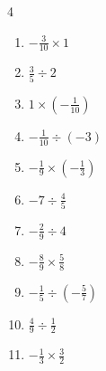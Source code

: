 \begin{multicols}{4}
\begin{enumerate}

  \item $\displaystyle -\frac{3}{10}\times{}1$


  \item $\displaystyle \frac{3}{5}\div{}2$


  \item $\displaystyle 1\times{}\left(-\frac{1}{10}\right)$


  \item $\displaystyle -\frac{1}{10}\div{}\left(-3\right)$


  \item $\displaystyle -\frac{1}{9}\times{}\left(-\frac{1}{3}\right)$


  \item $\displaystyle -7\div{}\frac{4}{5}$


  \item $\displaystyle -\frac{2}{9}\div{}4$


\columnbreak %

  \item $\displaystyle -\frac{8}{9}\times{}\frac{5}{8}$


  \item $\displaystyle -\frac{1}{5}\div{}\left(-\frac{5}{7}\right)$


  \item $\displaystyle \frac{4}{9}\div{}\frac{1}{2}$


  \item $\displaystyle -\frac{1}{3}\times{}\frac{3}{2}$



\end{enumerate}
\end{multicols}
